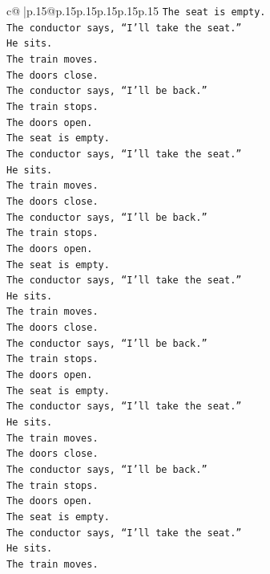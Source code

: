 \documentclass{article}
\begin{document}
{\begin{supertabular}{c@{$\;$}|p{.15\linewidth}@{}p{.15\linewidth}p{.15\linewidth}p{.15\linewidth}p{.15\linewidth}p{.15\linewidth}}
{{{\texttt{The seat is empty.} \\
\texttt{The conductor says, “I’ll take the seat.”} \\
\texttt{He sits.} \\
\texttt{The train moves.} \\
\texttt{The doors close.} \\
\texttt{The conductor says, “I’ll be back.”} \\
\texttt{The train stops.} \\
\texttt{The doors open.} \\
\texttt{The seat is empty.} \\
\texttt{The conductor says, “I’ll take the seat.”} \\
\texttt{He sits.} \\
\texttt{The train moves.} \\
\texttt{The doors close.} \\
\texttt{The conductor says, “I’ll be back.”} \\
\texttt{The train stops.} \\
\texttt{The doors open.} \\
\texttt{The seat is empty.} \\
\texttt{The conductor says, “I’ll take the seat.”} \\
\texttt{He sits.} \\
\texttt{The train moves.} \\
\texttt{The doors close.} \\
\texttt{The conductor says, “I’ll be back.”} \\
\texttt{The train stops.} \\
\texttt{The doors open.} \\
\texttt{The seat is empty.} \\
\texttt{The conductor says, “I’ll take the seat.”} \\
\texttt{He sits.} \\
\texttt{The train moves.} \\
\texttt{The doors close.} \\
\texttt{The conductor says, “I’ll be back.”} \\
\texttt{The train stops.} \\
\texttt{The doors open.} \\
\texttt{The seat is empty.} \\
\texttt{The conductor says, “I’ll take the seat.”} \\
\texttt{He sits.} \\
\texttt{The train moves.} \\
}}}
\end{supertabular}}
\end{document}
